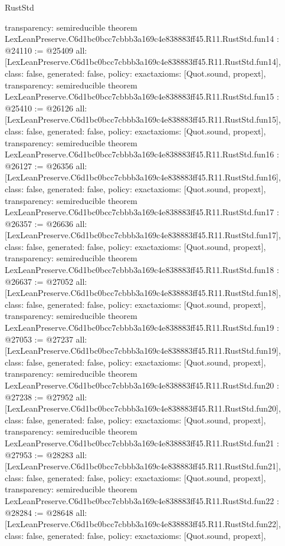 \begin{lexlean}{RustStd}
\begin{coremodule}
{  transparency: semireducible
}
theorem LexLeanPreserve.C6d1bc0bcc7cbbb3a169c4e838883ff45.R11.RustStd.fun14 : @24110 := @25409 {
  all: [LexLeanPreserve.C6d1bc0bcc7cbbb3a169c4e838883ff45.R11.RustStd.fun14],
  class: false,
  generated: false,
  policy: exact{axioms: [Quot.sound, propext]},
  transparency: semireducible
}
theorem LexLeanPreserve.C6d1bc0bcc7cbbb3a169c4e838883ff45.R11.RustStd.fun15 : @25410 := @26126 {
  all: [LexLeanPreserve.C6d1bc0bcc7cbbb3a169c4e838883ff45.R11.RustStd.fun15],
  class: false,
  generated: false,
  policy: exact{axioms: [Quot.sound, propext]},
  transparency: semireducible
}
theorem LexLeanPreserve.C6d1bc0bcc7cbbb3a169c4e838883ff45.R11.RustStd.fun16 : @26127 := @26356 {
  all: [LexLeanPreserve.C6d1bc0bcc7cbbb3a169c4e838883ff45.R11.RustStd.fun16],
  class: false,
  generated: false,
  policy: exact{axioms: [Quot.sound, propext]},
  transparency: semireducible
}
theorem LexLeanPreserve.C6d1bc0bcc7cbbb3a169c4e838883ff45.R11.RustStd.fun17 : @26357 := @26636 {
  all: [LexLeanPreserve.C6d1bc0bcc7cbbb3a169c4e838883ff45.R11.RustStd.fun17],
  class: false,
  generated: false,
  policy: exact{axioms: [Quot.sound, propext]},
  transparency: semireducible
}
theorem LexLeanPreserve.C6d1bc0bcc7cbbb3a169c4e838883ff45.R11.RustStd.fun18 : @26637 := @27052 {
  all: [LexLeanPreserve.C6d1bc0bcc7cbbb3a169c4e838883ff45.R11.RustStd.fun18],
  class: false,
  generated: false,
  policy: exact{axioms: [Quot.sound, propext]},
  transparency: semireducible
}
theorem LexLeanPreserve.C6d1bc0bcc7cbbb3a169c4e838883ff45.R11.RustStd.fun19 : @27053 := @27237 {
  all: [LexLeanPreserve.C6d1bc0bcc7cbbb3a169c4e838883ff45.R11.RustStd.fun19],
  class: false,
  generated: false,
  policy: exact{axioms: [Quot.sound, propext]},
  transparency: semireducible
}
theorem LexLeanPreserve.C6d1bc0bcc7cbbb3a169c4e838883ff45.R11.RustStd.fun20 : @27238 := @27952 {
  all: [LexLeanPreserve.C6d1bc0bcc7cbbb3a169c4e838883ff45.R11.RustStd.fun20],
  class: false,
  generated: false,
  policy: exact{axioms: [Quot.sound, propext]},
  transparency: semireducible
}
theorem LexLeanPreserve.C6d1bc0bcc7cbbb3a169c4e838883ff45.R11.RustStd.fun21 : @27953 := @28283 {
  all: [LexLeanPreserve.C6d1bc0bcc7cbbb3a169c4e838883ff45.R11.RustStd.fun21],
  class: false,
  generated: false,
  policy: exact{axioms: [Quot.sound, propext]},
  transparency: semireducible
}
theorem LexLeanPreserve.C6d1bc0bcc7cbbb3a169c4e838883ff45.R11.RustStd.fun22 : @28284 := @28648 {
  all: [LexLeanPreserve.C6d1bc0bcc7cbbb3a169c4e838883ff45.R11.RustStd.fun22],
  class: false,
  generated: false,
  policy: exact{axioms: [Quot.sound, propext]},
}
\end{coremodule}
\end{lexlean}
